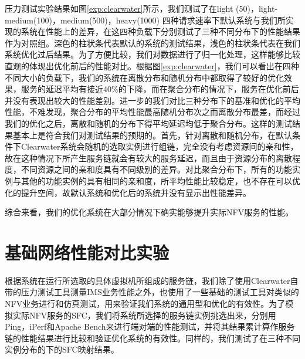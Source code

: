 压力测试实验结果如图\ref{exp:clearwater}所示，我们测试了在light (50)，light-medium(100)，medium(500)，heavy(1000) 四种请求速率下默认系统与我们所实现的系统在性能上的差异，在这四种负载下分别测试了三种不同分布下的性能结果作为对照组。深色的柱状条代表默认的系统的测试结果，浅色的柱状条代表在我们系统优化过后结果。为了方便比较，我们对数据进行了归一化处理，这样能够比较直观的体现出优化前后的性能对比。根据图\ref{exp:clearwater}，我们可以看出在四种不同大小的负载下，我们的系统在离散分布和随机分布中都取得了较好的优化效果，服务的延迟平均有接近40\%的下降，而在聚合分布的情况下，服务在优化前后并没有表现出较大的性能差别。进一步的我们对比三种分布下的基准和优化的平均性能，不难发现，聚合分布的平均性能最高随机分布次之而离散分布最差，而经过我们的优化之后，离散和随机的分布下得平均延迟均低于聚合分布。这样的测试结果基本上是符合我们对测试结果的预期的。首先，针对离散和随机分布，在默认条件下Clearwater系统会随机的选取实例进行组链，完全没有考虑资源间的亲和性，故在这种情况下所产生服务链就会有较大的服务延迟，而且由于资源分布的离散程度，不同资源之间的亲和度具有不同级别的差异。对比聚合分布下，所有的功能实例与其他的功能实例的具有相同的亲和度，所平均性能比较稳定，也不存在可以优化的提升空间，故默认系统和优化后的系统并没有显示出性能差异。

综合来看，我们的优化系统在大部分情况下确实能够提升实际NFV服务的性能。

\section{基础网络性能对比实验}
根据系统在运行所选取的具体虚拟机所组成的服务链，我们除了使用Clearwater自带的压力测试工具测量IMS业务性能之外，也使用了一些基础的测试工具对类似的NFV业务进行和仿真测试，用来验证我们系统的通用型和优化的有效性。为了模拟实际NFV服务的SFC，我们将系统所选择的服务链实例挑选出来，分别用Ping，iPerf和Apache Bench来进行端对端的性能测试，并将其结果累计算作服务链的性能结果进行比较和验证优化系统的有效性。同样的，我们测试了在三种不同实例分布的下的SFC映射结果。

